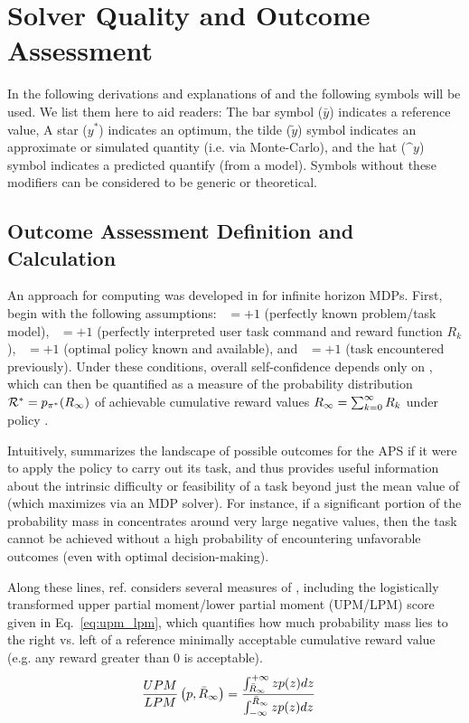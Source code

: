 \section{Solver Quality and Outcome Assessment}
In the following derivations and explanations of \xO{} and \xQ{} the following symbols will be used. We list them here to aid readers: The bar symbol ($\bar{y}$) indicates a reference value, A star ($y^*$) indicates an optimum, the tilde ($\tilde{y}$) symbol indicates an approximate or simulated quantity (i.e. via Monte-Carlo), and the hat ($\^{y}$) symbol indicates a predicted quantify (from a model). Symbols without these modifiers can be considered to be generic or theoretical.

\subsection{Outcome Assessment Definition and Calculation} \label{sec:xO}
An approach for computing \xO{} was developed in \cite{Aitken2016-cv} for infinite horizon MDPs. First, begin with the following assumptions: \xM~$=+1$ (perfectly known problem/task model), \xI~$= +1$ (perfectly interpreted user task command and reward function $R_k$), \xQ~$=+1$ (optimal policy \piopt{} known and available), and \xP~$=+1$ (task encountered previously). Under these conditions, overall self-confidence depends only on \xO{}, which can then be quantified as a measure of the probability distribution  $\mathcal{R}^* = p_{\pi^*}(R_{\infty})$ of achievable cumulative reward values $R_{\infty}= \sum_{k=0}^{\infty}R_{k}$ under policy \piopt.

Intuitively, \rwdopt{} summarizes the landscape of possible outcomes for the APS if it were to apply the policy \piopt{} to carry out its task, and thus provides useful information about the intrinsic difficulty or feasibility of a task beyond just the mean value of \ri{} (which \piopt{} maximizes via an MDP solver). For instance, if a significant portion of the probability mass in \rwdopt{} concentrates around very large negative values, then the task cannot be achieved without a high probability of encountering unfavorable outcomes (even with optimal decision-making). 

Along these lines, ref. \cite{Aitken2016-cv} considers several measures of \rwdopt, including the logistically transformed upper partial moment/lower partial moment (UPM/LPM) score given in Eq.~\ref{eq:upm_lpm}, which quantifies how much probability mass lies to the right vs. left of a reference minimally acceptable cumulative reward value \ris{} (e.g. any reward greater than 0 is acceptable).
    \begin{align}
        \frac{UPM}{LPM}\left(p,\riref\right) &= \frac{\int_{\riref}^{+\infty}zp(z)dz}{\int_{-\infty}^{\riref} zp(z)dz} \label{eq:upm_lpm}
    \end{align}

